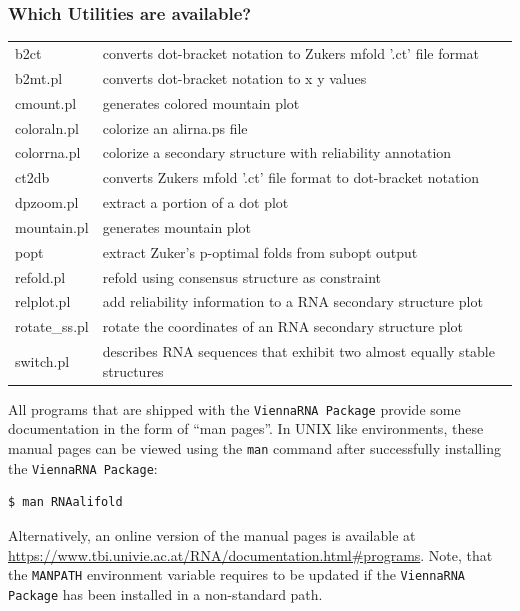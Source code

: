 \documentclass[a4paper]{article}
\newcommand{\frametitle}[1]{\subsubsection{#1}}
\begin{document}

  \frametitle{Which Utilities are available?}
	
  {\small
  \begin{tabular}{ll}
	b2ct	& converts dot-bracket notation to Zukers mfold '.ct' file format \\
	b2mt.pl	& converts dot-bracket notation to x y values \\
	cmount.pl	& generates colored mountain plot\\
	coloraln.pl	& colorize an alirna.ps file\\
	colorrna.pl	& colorize a secondary structure with reliability annotation\\
	ct2db	& converts Zukers mfold '.ct' file format to dot-bracket notation\\
	dpzoom.pl	& extract a portion of a dot plot \\
	mountain.pl	& generates mountain plot \\
	popt	& extract Zuker's p-optimal folds from subopt output\\
	refold.pl	& refold using consensus structure as constraint\\
	relplot.pl	& add reliability information to a RNA secondary structure plot\\
	rotate\_ss.pl	& rotate the coordinates of an RNA secondary structure plot\\
	switch.pl	& describes RNA sequences that exhibit two almost equally stable structures\\
  \end{tabular}}
\noindent

\vspace*{2ex}\noindent
All programs that are shipped with the \texttt{ViennaRNA Package} provide
some documentation in the form of ``man pages''. In UNIX like environments, these
manual pages can be viewed using the \texttt{man} command after successfully
installing the \texttt{ViennaRNA Package}:
\begin{verbatim}
$ man RNAalifold
\end{verbatim}%
Alternatively, an online version of the manual pages is available at\\
\url{https://www.tbi.univie.ac.at/RNA/documentation.html#programs}.
Note, that the \texttt{MANPATH} environment variable requires to be updated
if the \texttt{ViennaRNA Package} has been installed in a non-standard path.
\end{document}
